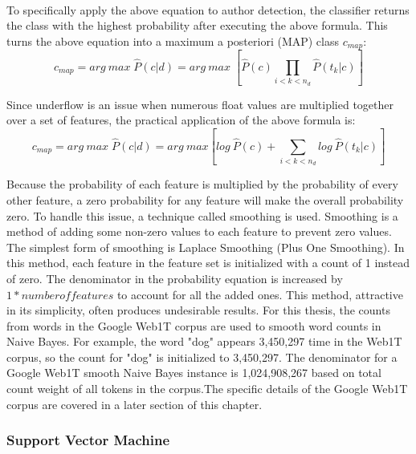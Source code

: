 			\paragraph{} To specifically apply the above equation to author detection, the classifier returns the class with the highest probability after executing the above formula.  This turns the above equation into a maximum a posteriori (MAP) class $c_{map}$:
				\begin{equation} c_{map} = arg \: max \; \hat{P}(c|d) = arg \: max \; [ \hat{P}(c) \prod_{i<k<n_d} \hat{P}(t_k|c) ] \end{equation}

			Since underflow is an issue when numerous float values are multiplied together over a set of features, the practical application of the above formula is:
				\begin{equation} c_{map} = arg \: max \; \hat{P}(c|d) = arg \: max [ log \: \hat{P}(c) + \sum_{i<k<n_d} log \: \hat{P}(t_k|c) ] \end{equation}
			
			Because the probability of each feature is multiplied by the probability of every other feature, a zero probability for any feature will make the overall probability zero.  To handle this issue, a technique called smoothing is used.  Smoothing is a method of adding some non-zero values to each feature to prevent zero values.  The simplest form of smoothing is Laplace Smoothing (Plus One Smoothing).  In this method, each feature in the feature set is initialized with a count of 1 instead of zero.  The denominator in the probability equation is increased by $1 * number of features$ to account for all the added ones.  This method, attractive in its simplicity, often produces undesirable results.  For this thesis, the counts from words in the Google Web1T corpus are used to smooth word counts in Naive Bayes.  For example, the word "dog" appears 3,450,297 time in the Web1T corpus, so the count for "dog" is initialized to 3,450,297.  The denominator for a Google Web1T smooth Naive Bayes instance is 1,024,908,267 based on total count weight of all tokens in the corpus.The specific details of the Google Web1T corpus are covered in a later section of this chapter.

		\subsubsection{Support Vector Machine}

